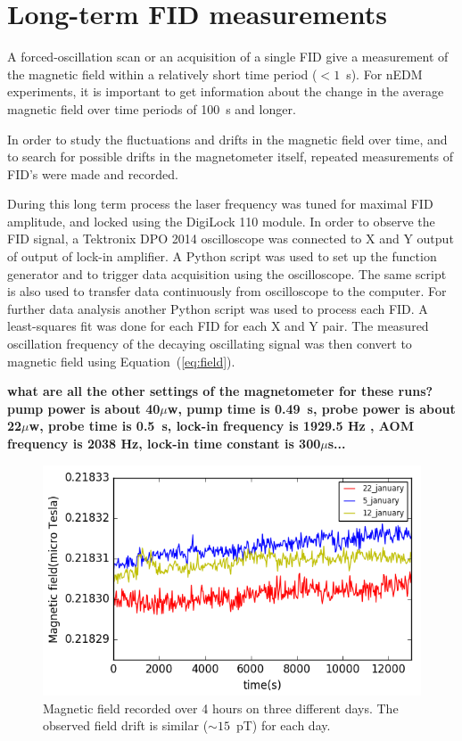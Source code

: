 \section{Long-term FID measurements\label{sec:long-term}}

A forced-oscillation scan or an acquisition of a single FID give a
measurement of the magnetic field within a relatively short time
period ($<1$~s).  For nEDM experiments, it is important to get
information about the change in the average magnetic field over time
periods of 100~s and longer.

In order to study the fluctuations and drifts in the magnetic field
over time, and to search for possible drifts in the magnetometer
itself, repeated measurements of FID's were made and recorded.

During this long term process the laser frequency was tuned for
maximal FID amplitude, and locked using the DigiLock 110 module.  In
order to observe the FID signal, a Tektronix DPO 2014 oscilloscope was
connected to X and Y output of output of lock-in amplifier. A Python
script was used to set up the function generator and to trigger data
acquisition using the oscilloscope. The same script is also used to
transfer data continuously from oscilloscope to the computer.  For
further data analysis another Python script was used to process each
FID.  A least-squares fit was done for each FID for each X and Y pair.
The measured oscillation frequency of the decaying oscillating signal
was then convert to magnetic field using Equation~(\ref{eq:field}).

{\bf what are all the other settings of the magnetometer for these
  runs?  pump power is about 40$\mu$w,  pump time is 0.49~s,  probe power is about 22$\mu$w,  probe time is 0.5~s,  lock-in
  frequency is 1929.5 Hz , AOM frequency is 2038 Hz, lock-in time constant is 300$\mu$s...}

\begin{figure}%
\centering\includegraphics[width=0.85\linewidth]{figures/field_3_day}
\caption{Magnetic field recorded over 4 hours on three different
  days. The observed field drift is similar ($\sim 15$~pT) for each
  day.\label{fig:long-term-field}}
\end{figure}

